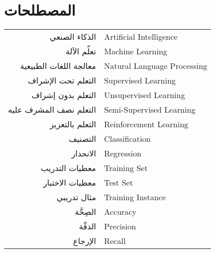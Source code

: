 

\chapter*{المصطلحات}

\begin{doublespacing}
	\begin{center}
		\begin{longtable}{r l}
			
			
			الذكاء الصنعي 			&		 	\textenglish{Artificial Intelligence}			\\
			
			
			تعلّم الآلة	 			& 			\textenglish{Machine Learning}			\\
			
			
			معالجة اللغات الطبيعية		& 			\textenglish{Natural Language Processing}	\\
			
			
			التعلم تحت الإشراف		& 			\textenglish{Supervised Learning}	\\
			
			
			التعلم بدون إشراف		& 			\textenglish{Unsupervised Learning}	\\
			
			
			التعلم نصف المشرف عليه		& 			\textenglish{Semi-Supervised Learning}	\\
			
			
			التعلم بالتعزيز		& 			\textenglish{Reinforcement Learning}	\\
			
			
			التصنيف		& 			\textenglish{Classification}	\\
			
			
			الانحدار		& 			\textenglish{Regression}	\\
			
			معطيات التدريب		& 			\textenglish{Training Set}	\\
			
			معطيات الاختبار		& 			\textenglish{Test Set}	\\
			
			
			مثال تدريبي		& 			\textenglish{Training Instance}	\\
			
			
			الصِحَّة			& 			\textenglish{Accuracy}				\\
			
			الدقّة			& 			\textenglish{Precision}				\\
			
			الإرجاع			& 			\textenglish{Recall}				\\
			

\end{longtable}
\end{center}
\end{doublespacing}
